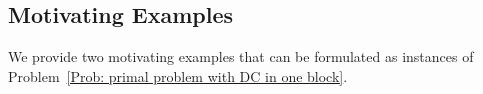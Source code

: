 \documentclass{article}
\theoremstyle{plain}
\theoremstyle{definition}
\theoremstyle{remark}
\newcommand{\zero}{\bm{0}}
\newcommand{\RR}{\mathbb{R}}
\newcommand{\bX}{\bm{X}}
\newcommand{\bx}{\bm{x}}
\newcommand{\bu}{\bm{u}}
\newcommand{\bY}{\bm{Y}}
\newcommand{\bv}{\bm{v}}
\newcommand{\bw}{\bm{w}}
\newcommand{\bS}{\bm{S}}
\newcommand{\bW}{\bm{W}}
\newcommand{\tf}{\mathbf{f}}
\numberwithin{equation}{section}
\begin{document}
\subsection{Motivating Examples}
We provide two motivating examples that can be formulated as instances of Problem~\eqref{Prob: primal problem with DC in one block}.



\end{document}

